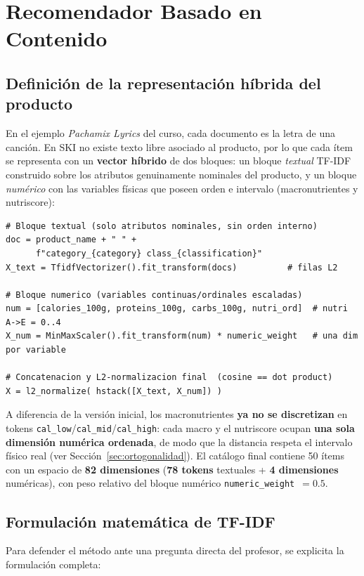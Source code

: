 \documentclass[12pt,a4paper]{article}
\newcommand{\metric}[1]{\textcolor{metricblue}{\textbf{#1}}}
\newcommand{\code}[1]{\texttt{\small #1}}
\begin{document}
\section{Recomendador Basado en Contenido}

\subsection{Definición de la representación híbrida del producto}
En el ejemplo \textit{Pachamix Lyrics} del curso, cada documento es la letra de una canción. En SKI no existe texto libre asociado al producto, por lo que cada ítem se representa con un \textbf{vector híbrido} de dos bloques: un bloque \emph{textual} TF-IDF construido sobre los atributos genuinamente nominales del producto, y un bloque \emph{numérico} con las variables físicas que poseen orden e intervalo (macronutrientes y nutriscore):

\begin{lstlisting}[style=pystyle]
# Bloque textual (solo atributos nominales, sin orden interno)
doc = product_name + " " +
      f"category_{category} class_{classification}"
X_text = TfidfVectorizer().fit_transform(docs)          # filas L2

# Bloque numerico (variables continuas/ordinales escaladas)
num = [calories_100g, proteins_100g, carbs_100g, nutri_ord]  # nutri A->E = 0..4
X_num = MinMaxScaler().fit_transform(num) * numeric_weight   # una dim por variable

# Concatenacion y L2-normalizacion final  (cosine == dot product)
X = l2_normalize( hstack([X_text, X_num]) )
\end{lstlisting}

A diferencia de la versión inicial, los macronutrientes \textbf{ya no se discretizan} en tokens \code{cal\_low}/\code{cal\_mid}/\code{cal\_high}: cada macro y el nutriscore ocupan \textbf{una sola dimensión numérica ordenada}, de modo que la distancia respeta el intervalo físico real (ver Sección~\ref{sec:ortogonalidad}). El catálogo final contiene 50 ítems con un espacio de \metric{82 dimensiones} (\metric{78 tokens} textuales + \metric{4 dimensiones} numéricas), con peso relativo del bloque numérico \code{numeric\_weight}~$=0.5$.

\subsection{Formulación matemática de TF-IDF}
\label{sec:tfidf}

Para defender el método ante una pregunta directa del profesor, se explicita la formulación completa:
\end{document}
